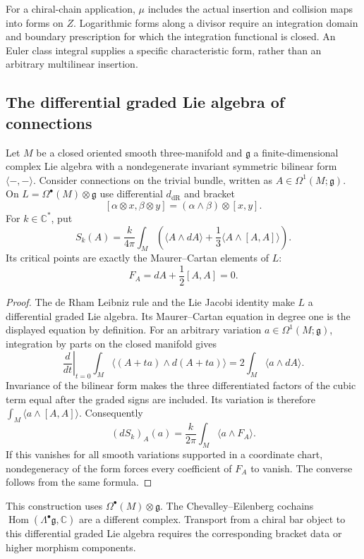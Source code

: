 For a chiral-chain application, $\mu$ includes the actual insertion and collision maps into forms on $Z$.
Logarithmic forms along a divisor require an integration domain and boundary prescription for which the integration functional is closed.
An Euler class integral supplies a specific characteristic form, rather than an arbitrary multilinear insertion.

\subsection{The differential graded Lie algebra of connections}

\begin{theorem}
\label{thm:cs-koszul-km}
Let $M$ be a closed oriented smooth three-manifold and $\mathfrak g$ a finite-dimensional complex Lie algebra with a nondegenerate invariant symmetric bilinear form $\langle-,-\rangle$.
Consider connections on the trivial bundle, written as $A\in\Omega^1(M;\mathfrak g)$.
On $L=\Omega^\bullet(M)\otimes\mathfrak g$ use differential $d_{\mathrm{dR}}$ and bracket
\[
 [\alpha\otimes x,\beta\otimes y]
  =(\alpha\wedge\beta)\otimes[x,y].
\]
For $k\in\mathbb C^*$, put
\[
 S_k(A)=\frac{k}{4\pi}\int_M
 \left(\langle A\wedge dA\rangle
       +\frac13\langle A\wedge[A,A]\rangle\right).
\]
Its critical points are exactly the Maurer--Cartan elements of $L$:
\[
 F_A=dA+\frac12[A,A]=0.
\]
\end{theorem}

\begin{proof}
The de Rham Leibniz rule and the Lie Jacobi identity make $L$ a differential graded Lie algebra.
Its Maurer--Cartan equation in degree one is the displayed equation by definition.
For an arbitrary variation $a\in\Omega^1(M;\mathfrak g)$, integration by parts on the closed manifold gives
\[
 \left.\frac{d}{dt}\right|_{t=0}\int_M\langle(A+ta)\wedge d(A+ta)\rangle
 =2\int_M\langle a\wedge dA\rangle.
\]
Invariance of the bilinear form makes the three differentiated factors of the cubic term equal after the graded signs are included.
Its variation is therefore $\int_M\langle a\wedge[A,A]\rangle$.
Consequently
\[
 (dS_k)_A(a)=\frac{k}{2\pi}\int_M\langle a\wedge F_A\rangle.
\]
If this vanishes for all smooth variations supported in a coordinate chart, nondegeneracy of the form forces every coefficient of $F_A$ to vanish.
The converse follows from the same formula.
\end{proof}

This construction uses $\Omega^\bullet(M)\otimes\mathfrak g$.
The Chevalley--Eilenberg cochains $\operatorname{Hom}(\Lambda^\bullet\mathfrak g,\mathbb C)$ are a different complex.
Transport from a chiral bar object to this differential graded Lie algebra requires the corresponding bracket data or higher morphism components.

